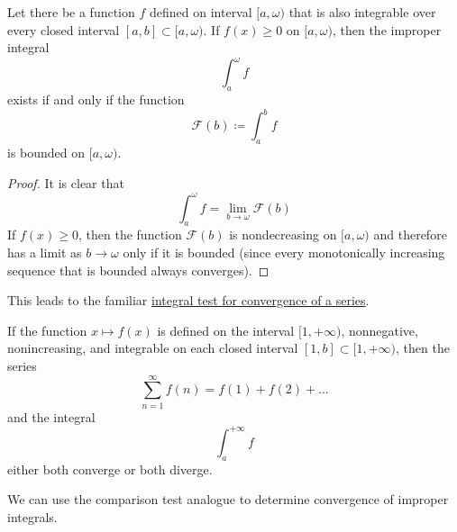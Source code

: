   \begin{lemma}
    \label{thm:cauchy-criterion-for-an-improper-integral}
    Let there be a function $f$ defined on interval $[a, \omega)$ that is also integrable over every closed interval $[a, b] \subset [a, \omega)$. If $f(x) \geq 0$ on $[a, \omega)$, then the improper integral 
    \begin{equation}
      \int_a^\omega f
    \end{equation}
    exists if and only if the function 
    \begin{equation}
      \mathcal{F}(b) \coloneqq \int_a^b f
    \end{equation}
    is bounded on $[a, \omega)$. 
  \end{lemma}
  \begin{proof}
    It is clear that 
    \begin{equation}
      \int_a^\omega f = \lim_{b \rightarrow \omega} \mathcal{F}(b)
    \end{equation}
    If $f(x)\geq 0$, then the function $\mathcal{F}(b)$ is nondecreasing on $[a, \omega)$ and therefore has a limit as $b \rightarrow \omega$ only if it is bounded (since every monotonically increasing sequence that is bounded always converges). 
  \end{proof}

  This leads to the familiar \hyperref[thm:integral-test-for-convergence-of-a-series]{integral test for convergence of a series}. 

  \begin{theorem}
    \label{thm:integral-test-for-convergence-of-a-series}
    If the function $x \mapsto f(x)$ is defined on the interval $[1, +\infty)$, nonnegative, nonincreasing, and integrable on each closed interval $[1, b] \subset [1, +\infty)$, then the series 
    \begin{equation}
      \sum_{n=1}^\infty f(n) = f(1) + f(2) + \ldots
    \end{equation}
    and the integral 
    \begin{equation}
      \int_a^{+\infty} f
    \end{equation}
    either both converge or both diverge. 
  \end{theorem}

  We can use the comparison test analogue to determine convergence of improper integrals. 

